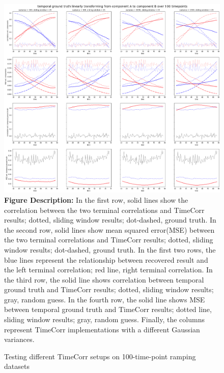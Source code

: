 \documentclass[11pt]{article}
\begin{document}
\begin{figure}[!htb]
\caption{Testing different TimeCorr setups on 100-time-point ramping datasets}
\includegraphics[width=1\textwidth]{../figures/SyntheticTesting/ramp100t4var.png}
\label{fig:ramp100t4var}
\small{\textbf{Figure Description:} In the first row, solid lines show the correlation between the two terminal correlations and TimeCorr results; dotted, sliding window results; dot-dashed, ground truth. In the second row, solid lines show mean squared error(MSE) between the two terminal correlations and TimeCorr results; dotted, sliding window results; dot-dashed, ground truth. In the first two rows, the blue lines represent the relationship between recovered result and the left terminal correlation; red line, right terminal correlation. In the third row, the solid line shows correlation between temporal ground truth and TimeCorr results; dotted, sliding window results; gray, random guess. In the fourth row, the solid line shows MSE between temporal ground truth and TimeCorr results; dotted line, sliding window results; gray, random guess. Finally, the columns represent TimeCorr implementations with a different Gaussian variances.}
\end{figure}
\end{document}
